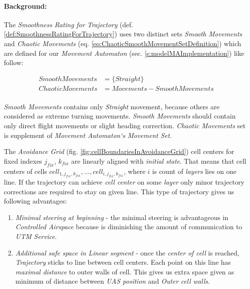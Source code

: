 \paragraph{Background:} The \emph{Smoothness Rating for Trajectory} (def. \ref{def:SmoothnessRatingForTrajectory}) uses two distinct sets \emph{Smooth Movements} and \emph{Chaotic Movements} (eq. \ref{eq:ChaoticSmoothMovementSetDefinition}) which are defined for our \emph{Movement Automaton}  (sec. \ref{s:modelMAImplementation}) like follow:

\begin{equation}
    \begin{aligned}
    Smooth Movements &= \{Straight\} \\
    Chaotic Movements &= Movements - Smooth Movements\\
    \end{aligned}
\end{equation}

\emph{Smooth Movements} contains only \emph{Straight} movement, because others are considered as extreme turning movements. \emph{Smooth Movements} should contain only direct flight movements or slight heading correction. \emph{Chaotic Movements} set is supplement of \emph{Movement Automaton`s Movement Set}. 

The \emph{Avoidance Grid} (fig. \ref{fig:cellBoundariesInAvoidanceGrid}) cell centers for fixed indexes $j_{fix}$, $k_{fix}$ are linearly aligned with \emph{initial state}. That means that  cell centers of cells $cell_{1,j_{fix},k_{fix}},\dots, cell_{i,j_{fix},k_{fix}}$, where $i$ is count of \emph{layers} lies on one line.  If the trajectory can achieve \emph{cell center} on some \emph{layer} only minor trajectory corrections are required to stay on given line. This type of trajectory gives us following advantages:
\begin{enumerate}
    \item\emph{Minimal steering at beginning} - the minimal steering is advantageous in \emph{Controlled Airspace} because is diminishing the amount of communication to \emph{UTM Service}.
    
    \item\emph{Additional safe space in Linear segment} - once the \emph{center of cell} is reached, \emph{Trajectory} sticks to line between cell centers. Each point on this line has \emph{maximal distance} to outer walls of cell. This gives us extra space given as minimum of distance between \emph{UAS position} and \emph{Outer cell walls}.
\end{enumerate}

